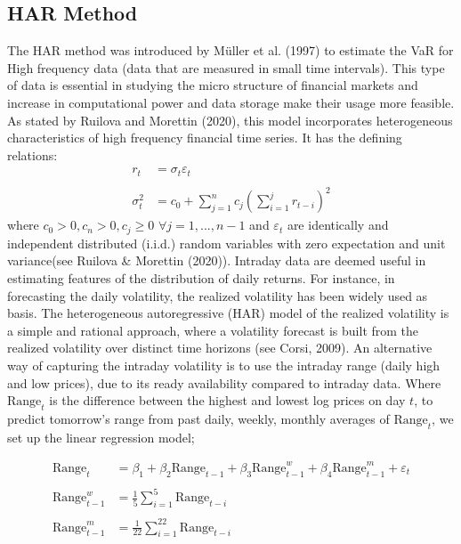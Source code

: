 \documentclass[a4paper,11pt,oneside]{book}
\begin{document}
\subsection{HAR Method}
The HAR method was introduced by Müller et al. (1997) to estimate the VaR for High frequency data (data that are measured in small time intervals). This type of data is essential in studying the micro structure of financial markets and  increase in computational power and data storage make their usage more feasible. As stated by Ruilova and Morettin (2020), this model incorporates
heterogeneous characteristics of high frequency financial time series. It has the defining relations: 
\begin{equation}
\begin{aligned}
r_t &= \sigma_t\varepsilon_t
\\
\\
\sigma_t^2 &= c_0 + \sum_{j=1}^{n}c_j\left(\sum_{i=1}^{j}r_{t-i}\right)^2
\label{3}
\end{aligned}
\end{equation}
where $c_0>0, c_n > 0, c_j \ge 0$ $\forall j = 1,...,n-1$ and $\varepsilon_t$ are identically and independent distributed (i.i.d.) random variables with zero expectation and unit variance(see Ruilova \& Morettin (2020)).
\newline
\newline
Intraday data are deemed useful in estimating features of the distribution of daily returns. For
instance, in forecasting the daily volatility, the realized volatility has been widely used as basis. The heterogeneous autoregressive (HAR) model of the realized
volatility is a simple and rational approach, where a
volatility forecast is built from the realized volatility over distinct time horizons (see Corsi, 2009). An alternative way of
capturing the intraday volatility is to use the intraday range (daily high and low prices), due to its ready availability compared to  intraday data. Where $\text{Range}_{t}$
is the difference between the highest and
lowest log prices on day $t$, to predict tomorrow's range from past daily, weekly, monthly averages of $\text{Range}_{t}$, we set up the linear regression model;

\begin{equation}
\begin{aligned}
\text{Range}_{t}&=\beta_1+\beta_{2}\text{Range}_{t-1}+\beta_{3}\text{Range}^{w}_{t-1}+\beta_{4}\text{Range}^{m}_{t-1}+\varepsilon_t
\\
\\
\text{Range}^{w}_{t-1}&=\frac{1}{5}\sum_{i=1}^{5}\text{Range}_{t-i}
\\
\\
\text{Range}^{m}_{t-1}&=\frac{1}{22}\sum_{i=1}^{22}\text{Range}_{t-i}
\label{4}
\end{aligned}
\end{equation}
\end{document}
